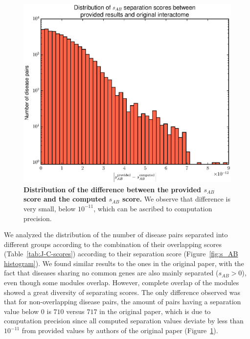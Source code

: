 \documentclass[letterpaper]{article}
\begin{document}
		\begin{figure}[!h]
		\includegraphics[width=.5\textwidth]{images/sep_difference_histogram.eps}
		\caption{{\bf Distribution of the difference between the provided $s_{AB}$ score and the computed
		$s_{AB}$ score.} We observe that difference is very small, below $10^{-11}$, which can be ascribed
		to computation precision.
		\label{fig:s_AB difference}}
		\end{figure}

		We analyzed the distribution of the number of disease pairs separated into different groups according
		to the combination of their overlapping scores (Table~\ref{tab:J-C-scores}) according to their
		separation score (Figure~\ref{fig:s_AB histogram}). We found similar results to the ones in the
		original paper, with the fact that diseases sharing no common genes are also mainly separated
		($s_{AB} > 0$), even though some modules overlap. However, complete overlap of the modules showed a
		great diversity of separating scores. The only difference observed was that for non-overlapping
		disease pairs, the amount of pairs having a separation value below 0 is $710$ versus $717$ in the
		original paper, which is due to computation precision since all computed separation values deviate
		by less than $10^{-11}$ from provided values by authors of the original paper
		(Figure~\ref{fig:s_AB difference}).
\end{document}
